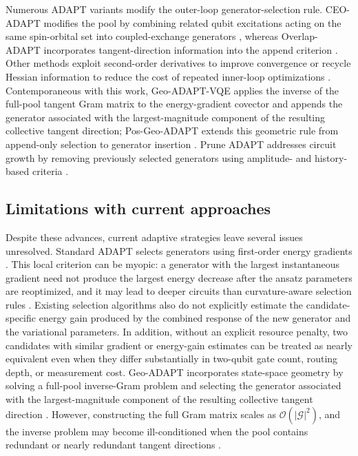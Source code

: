 \documentclass[
  reprint,
  amsmath,
  amssymb,
  aps,
  pra,
  nofootinbib,
  superscriptaddress,
  floatfix
]{revtex4-2}
\begin{document}
Numerous ADAPT variants modify the outer-loop generator-selection rule. CEO-ADAPT modifies the pool by combining related qubit excitations acting on the same spin-orbital set into coupled-exchange generators \cite{Ramoa2025}, whereas Overlap-ADAPT incorporates tangent-direction information into the append criterion \cite{Feniou2023}. Other methods exploit second-order derivatives to improve convergence \cite{Grimsley2023ADAPT} or recycle Hessian information to reduce the cost of repeated inner-loop optimizations \cite{Ramoa2025HessianRecycling}. Contemporaneous with this work, Geo-ADAPT-VQE applies the inverse of the full-pool tangent Gram matrix to the energy-gradient covector and appends the generator associated with the largest-magnitude component of the resulting collective tangent direction; Pos-Geo-ADAPT extends this geometric rule from append-only selection to generator insertion \cite{Sohail2026GeoADAPT}. Prune ADAPT addresses circuit growth by removing previously selected generators using amplitude- and history-based criteria \cite{Vaquero2025PrunedADAPT}.

\subsection{Limitations with current approaches}
Despite these advances, current adaptive strategies leave several issues unresolved. Standard ADAPT selects generators using first-order energy gradients \cite{Grimsley2019,Tang2021,Yordanov2021}. This local criterion can be myopic: a generator with the largest instantaneous gradient need not produce the largest energy decrease after the ansatz parameters are reoptimized, and it may lead to deeper circuits than curvature-aware selection rules \cite{Feniou2023,Grimsley2023ADAPT}. Existing selection algorithms also do not explicitly estimate the candidate-specific energy gain produced by the combined response of the new generator and the variational parameters. In addition, without an explicit resource penalty, two candidates with similar gradient or energy-gain estimates can be treated as nearly equivalent even when they differ substantially in two-qubit gate count, routing depth, or measurement cost.
Geo-ADAPT incorporates state-space geometry by solving a full-pool inverse-Gram problem and selecting the generator associated with the largest-magnitude component of the resulting collective tangent direction \cite{Sohail2026GeoADAPT}. However, constructing the full Gram matrix scales as $\mathcal{O}(|\mathcal{G}|^2)$, and the inverse problem may become ill-conditioned when the pool contains redundant or nearly redundant tangent directions \cite{Sohail2026GeoADAPT,Ramoa2025HessianRecycling,Ikhtiarudin2025ShotEfficient}.
\end{document}
